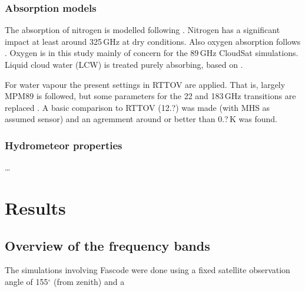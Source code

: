 \documentclass[12pt]{article}
\begin{document}
\subsubsection{Absorption models}
%
The absorption of nitrogen is modelled following \citet{pwr:93}. Nitrogen has a
significant impact at least around 325\,GHz at dry conditions. Also oxygen
absorption follows \citet{pwr:93}. Oxygen is in this study mainly of concern
for the 89\,GHz CloudSat simulations. Liquid cloud water (LCW) is treated
purely absorbing, based on \citet{ellison2007permittivity}.

For water vapour the present settings in RTTOV are applied. That is, largely
MPM89 \citep{liebe:89} is followed, but some parameters for the 22 and 183\,GHz
transitions are replaced \citep{saunders2018update,turner2019amsutran}. A basic
comparison to RTTOV (12.?) was made (with MHS as assumed sensor) and an
agremment around or better than 0.?\,K was found.



\subsubsection{Hydrometeor properties}
%
\dots



\section{Results}

\subsection{Overview of the frequency bands}
%
The simulations involving Fascode were done using a fixed satellite observation
angle of 155$^\circ$ (from zenith) and a  
\end{document}
